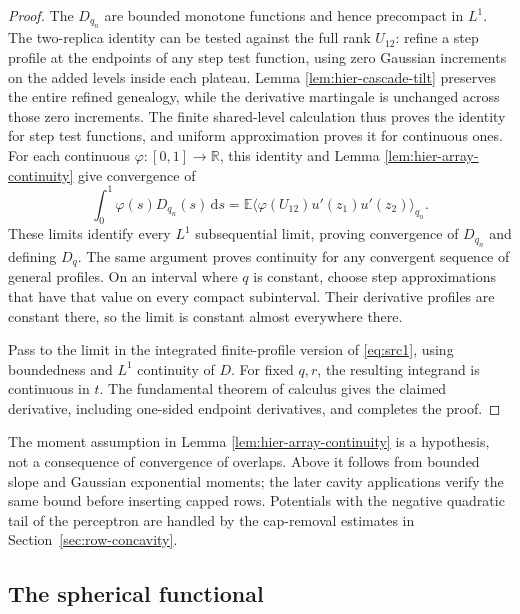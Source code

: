 \documentclass[11pt,a4paper]{article}
\numberwithin{equation}{section}
\theoremstyle{definition}
\theoremstyle{remark}
\newcommand{\E}{\mathbb E}
\newcommand{\R}{\mathbb R}
\newcommand{\dd}{\mathrm d}
\begin{document}
\begin{proof}
The $D_{q_n}$ are bounded monotone functions and hence precompact in $L^1$.
The two-replica identity can be tested against the full rank $U_{12}$:
refine a step profile at the endpoints of any step test function, using
zero Gaussian increments on the added levels inside each plateau.
Lemma \ref{lem:hier-cascade-tilt} preserves the entire refined genealogy,
while the derivative martingale is unchanged across those zero increments.
The finite shared-level calculation thus proves the identity for step
test functions, and uniform approximation proves it for continuous ones.
For each continuous $\varphi:[0,1]\to\R$, this identity and Lemma
\ref{lem:hier-array-continuity} give convergence of
\[
 \int_0^1\varphi(s)D_{q_n}(s)\,\dd s
 =\E\langle\varphi(U_{12})u'(z_1)u'(z_2)\rangle_{q_n}.
\]
These limits identify every $L^1$ subsequential limit, proving convergence
of $D_{q_n}$ and defining $D_q$.  The same argument proves continuity for
any convergent sequence of general profiles.  On an interval where $q$ is
constant, choose step approximations that have that value on every compact
subinterval.  Their derivative profiles are constant there, so the limit
is constant almost everywhere there.

Pass to the limit in the integrated finite-profile version of
\eqref{eq:src1}, using boundedness and $L^1$ continuity of $D$.  For fixed
$q,r$, the resulting integrand is continuous in $t$.  The fundamental
theorem of calculus gives the claimed derivative, including one-sided
endpoint derivatives, and completes the proof.
\end{proof}

The moment assumption in Lemma \ref{lem:hier-array-continuity} is a
hypothesis, not a consequence of convergence of overlaps.  Above it
follows from bounded slope and Gaussian exponential moments; the later
cavity applications verify the same bound before inserting capped rows.
Potentials with the negative quadratic tail of the perceptron are handled
by the cap-removal estimates in Section~\ref{sec:row-concavity}.

\subsection{The spherical functional}
\end{document}
